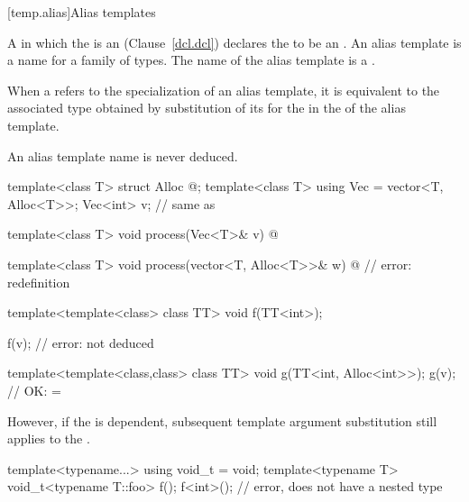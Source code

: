 [temp.alias]{Alias templates}

\pnum
A  in which the  is an
 (Clause~\ref{dcl.dcl}) declares the
 to be an .
An alias template is a name for a family of
types. The name of the alias template is a .

\pnum
When a  refers to the specialization of
an alias template, it is equivalent to the associated type obtained by
substitution of its  for the
 in the  of
the alias template.
\begin{note} An alias template name is never deduced.\end{note}
\begin{example}

\begin{codeblock}
template<class T> struct Alloc { @\commentellip@ };
template<class T> using Vec = vector<T, Alloc<T>>;
Vec<int> v;         // same as 

template<class T>
  void process(Vec<T>& v)
  { @\commentellip@ }

template<class T>
  void process(vector<T, Alloc<T>>& w)
  { @\commentellip@ }     // error: redefinition

template<template<class> class TT>
  void f(TT<int>);

f(v);               // error:  not deduced

template<template<class,class> class TT>
  void g(TT<int, Alloc<int>>);
g(v);               // OK:  = 
\end{codeblock}

\end{example}

\pnum
However, if the  is dependent, subsequent template
argument substitution still applies to the .
\begin{example}
\begin{codeblock}
template<typename...> using void_t = void;
template<typename T> void_t<typename T::foo> f();
f<int>();           // error,  does not have a nested type 
\end{codeblock}
\end{example}

